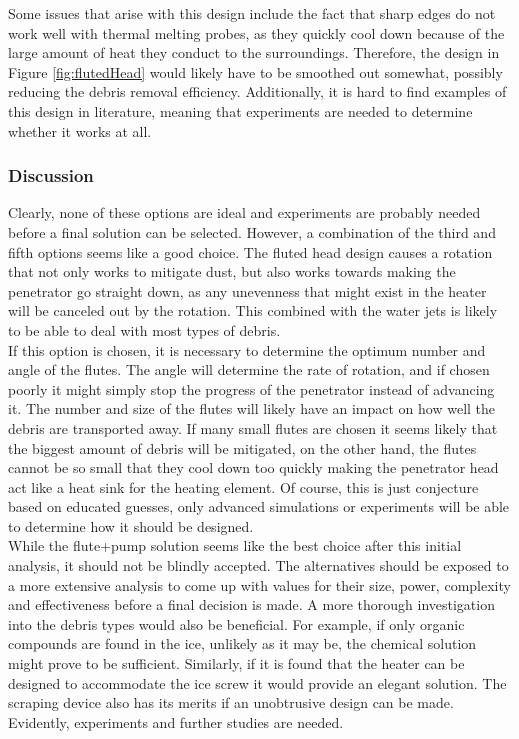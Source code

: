 \noindent
Some issues that arise with this design include the fact that sharp edges do not work well with thermal melting probes, as they quickly cool down because of the large amount of heat they conduct to the surroundings. Therefore, the design in Figure \ref{fig:flutedHead} would likely have to be smoothed out somewhat, possibly reducing the debris removal efficiency. Additionally, it is hard to find examples of this design in literature, meaning that experiments are needed to determine whether it works at all. \\

\subsubsection{Discussion}
Clearly, none of these options are ideal and experiments are probably needed before a final solution can be selected. However, a combination of the third and fifth options seems like a good choice. The fluted head design causes a rotation that not only works to mitigate dust, but also works towards making the penetrator go straight down, as any unevenness that might exist in the heater will be canceled out by the rotation. This combined with the water jets is likely to be able to deal with most types of debris. \\

\noindent
If this option is chosen, it is necessary to determine the optimum number and angle of the flutes. The angle will determine the rate of rotation, and if chosen poorly it might simply stop the progress of the penetrator instead of advancing it. The number and size of the flutes will likely have an impact on how well the debris are transported away. If many small flutes are chosen it seems likely that the biggest amount of debris will be mitigated, on the other hand, the flutes cannot be so small that they cool down too quickly making the penetrator head act like a heat sink for the heating element. Of course, this is just conjecture based on educated guesses, only advanced simulations or experiments will be able to determine how it should be designed.\\

\noindent
While the flute+pump solution seems like the best choice after this initial analysis, it should not be blindly accepted. The alternatives should be exposed to a more extensive analysis to come up with values for their size, power, complexity and effectiveness before a final decision is made. A more thorough investigation into the debris types would also be beneficial. For example, if only organic compounds are found in the ice, unlikely as it may be, the chemical solution might prove to be sufficient. Similarly, if it is found that the heater can be designed to accommodate the ice screw it would provide an elegant solution. The scraping device also has its merits if an unobtrusive design can be made.\\

\noindent
Evidently, experiments and further studies are needed.   








